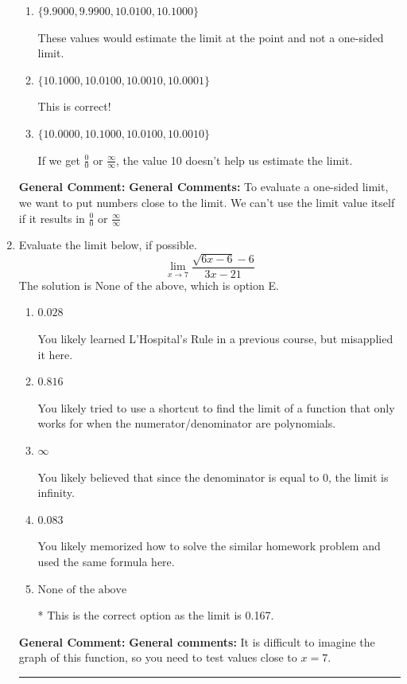 \documentclass{extbook}[14pt]
\newcommand{\litem}[1]{\item #1

\rule{\textwidth}{0.4pt}}
\begin{document}
\begin{enumerate}
{\begin{enumerate}[label=\Alph*.]
These values would estimate the limit of 10 on the left.
\item \( \{ 9.9000, 9.9900, 10.0100, 10.1000 \} \)

These values would estimate the limit at the point and not a one-sided limit.
\item \( \{ 10.1000, 10.0100, 10.0010, 10.0001 \} \)

This is correct!
\item \( \{ 10.0000, 10.1000, 10.0100, 10.0010 \} \)

If we get $\frac{0}{0}$ or $\frac{\infty}{\infty}$, the value 10 doesn't help us estimate the limit.
\end{enumerate}

\textbf{General Comment:} \textbf{General Comments:} To evaluate a one-sided limit, we want to put numbers close to the limit. We can't use the limit value itself if it results in $\frac{0}{0}$ or $\frac{\infty}{\infty}$
}
\litem{
Evaluate the limit below, if possible.
\[ \lim_{x \rightarrow 7} \frac{\sqrt{6x - 6} - 6}{3x - 21} \]The solution is \( \text{None of the above} \), which is option E.\begin{enumerate}[label=\Alph*.]
\item \( 0.028 \)

You likely learned L'Hospital's Rule in a previous course, but misapplied it here.
\item \( 0.816 \)

You likely tried to use a shortcut to find the limit of a function that only works for when the numerator/denominator are polynomials.
\item \( \infty \)

You likely believed that since the denominator is equal to 0, the limit is infinity.
\item \( 0.083 \)

You likely memorized how to solve the similar homework problem and used the same formula here.
\item \( \text{None of the above} \)

* This is the correct option as the limit is 0.167.
\end{enumerate}

\textbf{General Comment:} \textbf{General comments:} It is difficult to imagine the graph of this function, so you need to test values close to $x = 7$.
}
\end{enumerate}
\end{document}
